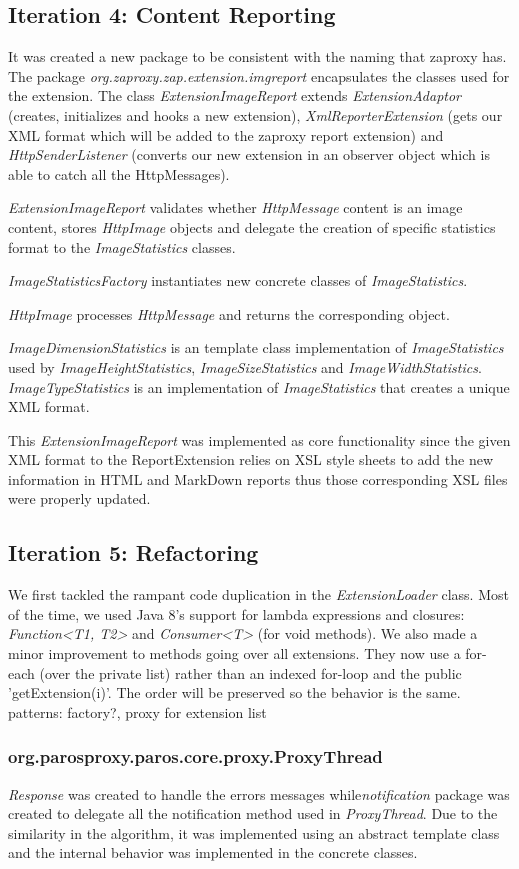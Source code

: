 \subsection{Iteration 4: Content Reporting}
It was created a new package to be consistent with the naming that zaproxy has. The package \textit{org.zaproxy.zap.extension.imgreport} encapsulates the classes used for the extension. The class \textit{ExtensionImageReport} extends \textit{ExtensionAdaptor} (creates, initializes and hooks a new extension), \textit{XmlReporterExtension} (gets our XML format which will be added to the zaproxy report extension) and \textit{HttpSenderListener} (converts our new extension in an observer object which is able to catch all the HttpMessages).
\par
\textit{ExtensionImageReport} validates whether \textit{HttpMessage} content is an image content, stores \textit{HttpImage} objects and delegate the creation of specific statistics format to the \textit{ImageStatistics} classes. 
\par
\textit{ImageStatisticsFactory} instantiates new concrete classes of \textit{ImageStatistics}.
\par
\textit{HttpImage} processes \textit{HttpMessage} and returns the corresponding object.
\par
\textit{ImageDimensionStatistics} is an template class implementation of \textit{ImageStatistics} used by \textit{ImageHeightStatistics}, \textit{ImageSizeStatistics} and \textit{ImageWidthStatistics}. \textit{ImageTypeStatistics} is an implementation of \textit{ImageStatistics} that creates a unique XML format.
\par
This \textit{ExtensionImageReport} was implemented as core functionality since the given XML format to the ReportExtension relies on XSL style sheets to add the new information in HTML and MarkDown reports thus those corresponding XSL files were properly updated.

\subsection{Iteration 5: Refactoring}
We first tackled the rampant code duplication in  the \textit{ExtensionLoader} class. Most of the time, we used Java 8's support for lambda expressions and closures: \textit{Function<T1, T2>} and \textit{Consumer<T>} (for void methods).
We also made a minor improvement to methods going over all extensions. They now use a for-each (over the private list) rather than an indexed for-loop and the public 'getExtension(i)'. The order will be preserved so the behavior is the same.
patterns: factory?, proxy for extension list
\subsubsection{org.parosproxy.paros.core.proxy.ProxyThread}

\textit{Response} was created to handle the errors messages while\textit{notification} package was created to delegate all the notification method used in \textit{ProxyThread}. Due to the similarity in the algorithm, it was implemented using an abstract template class and the internal behavior was implemented in the concrete classes.
